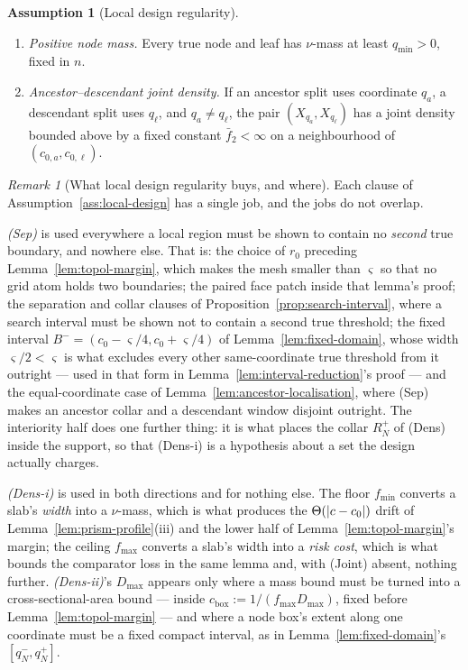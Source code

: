 \documentclass[11pt]{article}
\theoremstyle{plain}
\theoremstyle{definition}
\newtheorem{assumption}{Assumption}
\theoremstyle{remark}
\newtheorem{remark}[theorem]{Remark}
\DeclarePairedDelimiter{\abs}{\lvert}{\rvert}
\begin{document}
\begin{assumption}[Local design regularity]
\begin{enumerate}[leftmargin=*]
  \item[(Node)] \emph{Positive node mass.}
  Every true node and leaf has \(\nu\)-mass at least \(q_{\min}>0\), fixed in
  \(n\).

  \item[(Joint)] \emph{Ancestor--descendant joint density.}
  If an ancestor split uses coordinate \(q_a\), a descendant split uses
  \(q_\ell\), and \(q_a\ne q_\ell\), the pair \((X_{q_a},X_{q_\ell})\) has a
  joint density bounded above by a fixed constant \(\bar f_2<\infty\) on a
  neighbourhood of \((c_{0,a},c_{0,\ell})\).
\end{enumerate}
\end{assumption}

\begin{remark}[What local design regularity buys, and where]
\label{rem:local-design-role}
Each clause of Assumption~\ref{ass:local-design} has a single job, and the
jobs do not overlap.

\emph{(Sep)} is used everywhere a local region must be shown to contain no
\emph{second} true boundary, and nowhere else. That is: the choice of \(r_0\)
preceding Lemma~\ref{lem:topol-margin}, which makes the mesh smaller than
\(\varsigma\) so that no grid atom holds two boundaries; the paired face patch
inside that lemma's proof; the separation and collar clauses of
Proposition~\ref{prop:search-interval}, where a search interval must be shown
not to contain a second true threshold; the fixed interval
\(B^-=(c_0-\varsigma/4,c_0+\varsigma/4)\) of
Lemma~\ref{lem:fixed-domain}, whose width \(\varsigma/2<\varsigma\) is
what excludes every other same-coordinate true threshold from it
outright --- used in that form in Lemma~\ref{lem:interval-reduction}'s proof
--- and the equal-coordinate case of
Lemma~\ref{lem:ancestor-localisation}, where (Sep) makes an ancestor collar and
a descendant window disjoint outright. The interiority half does one further
thing: it is what places the collar \(R_N^+\) of (Dens) inside the support, so
that (Dens-i) is a hypothesis about a set the design actually charges.

\emph{(Dens-i)} is used in both directions and for nothing else. The floor
\(f_{\min}\) converts a slab's \emph{width} into a \(\nu\)-mass, which is what
produces the \(\Theta(\abs{c-c_0})\) drift of
Lemma~\ref{lem:prism-profile}(iii) and the lower half of
Lemma~\ref{lem:topol-margin}'s margin; the ceiling \(f_{\max}\) converts a
slab's width into a \emph{risk cost}, which is what bounds the comparator loss
in the same lemma and, with (Joint) absent, nothing further. \emph{(Dens-ii)}'s
\(D_{\max}\) appears only where a mass bound must be turned into a
cross-sectional-area bound --- inside
\(c_{\mathrm{box}}:=1/(f_{\max}D_{\max})\), fixed before
Lemma~\ref{lem:topol-margin} --- and where a node box's extent along one
coordinate must be a fixed compact interval, as in
Lemma~\ref{lem:fixed-domain}'s \([q_N^-,q_N^+]\).


\end{remark}
\end{document}
